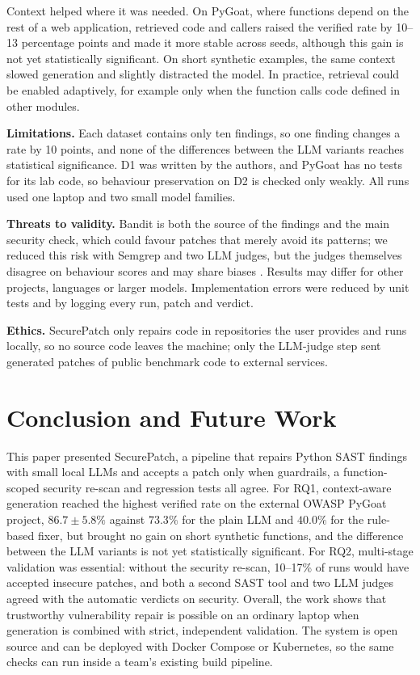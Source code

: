 \documentclass[12pt,onecolumn,draftclsnofoot]{IEEEtran}
\begin{document}
Context helped where it was needed. On PyGoat, where functions depend on the rest of a web application, retrieved code and callers raised the verified rate by 10--13 percentage points and made it more stable across seeds, although this gain is not yet statistically significant. On short synthetic examples, the same context slowed generation and slightly distracted the model. In practice, retrieval could be enabled adaptively, for example only when the function calls code defined in other modules.

\textbf{Limitations.} Each dataset contains only ten findings, so one finding changes a rate by 10 points, and none of the differences between the LLM variants reaches statistical significance. D1 was written by the authors, and PyGoat has no tests for its lab code, so behaviour preservation on D2 is checked only weakly. All runs used one laptop and two small model families.

\textbf{Threats to validity.} Bandit is both the source of the findings and the main security check, which could favour patches that merely avoid its patterns; we reduced this risk with Semgrep and two LLM judges, but the judges themselves disagree on behaviour scores and may share biases \cite{zheng2023judge}. Results may differ for other projects, languages or larger models. Implementation errors were reduced by unit tests and by logging every run, patch and verdict.

\textbf{Ethics.} SecurePatch only repairs code in repositories the user provides and runs locally, so no source code leaves the machine; only the LLM-judge step sent generated patches of public benchmark code to external services.

\section{Conclusion and Future Work}
This paper presented SecurePatch, a pipeline that repairs Python SAST findings with small local LLMs and accepts a patch only when guardrails, a function-scoped security re-scan and regression tests all agree. For RQ1, context-aware generation reached the highest verified rate on the external OWASP PyGoat project, $86.7 \pm 5.8\%$ against $73.3\%$ for the plain LLM and $40.0\%$ for the rule-based fixer, but brought no gain on short synthetic functions, and the difference between the LLM variants is not yet statistically significant. For RQ2, multi-stage validation was essential: without the security re-scan, 10--17\% of runs would have accepted insecure patches, and both a second SAST tool and two LLM judges agreed with the automatic verdicts on security. Overall, the work shows that trustworthy vulnerability repair is possible on an ordinary laptop when generation is combined with strict, independent validation. The system is open source and can be deployed with Docker Compose or Kubernetes, so the same checks can run inside a team's existing build pipeline.
\end{document}
